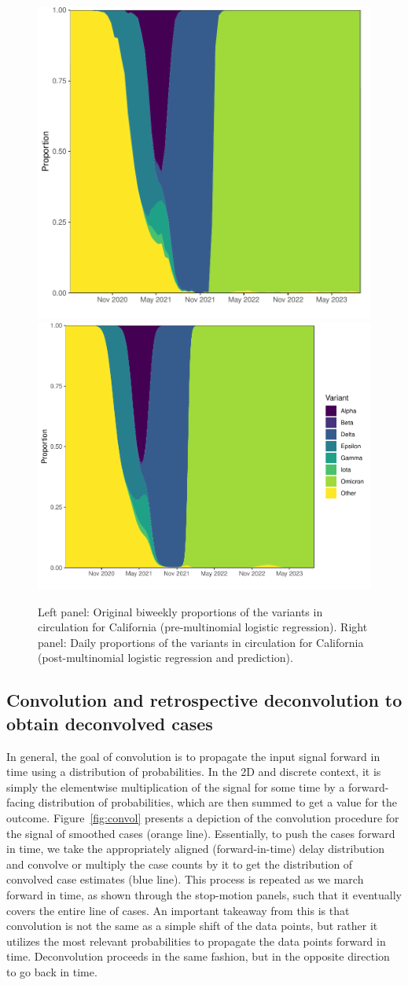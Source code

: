 \documentclass{article}
\begin{document}
\begin{figure}[!tb]
\centering
    \includegraphics[width=0.4\linewidth]{proportions_before_multi.pdf}
    \includegraphics[width=0.47\linewidth]{proportions_after_multi_pred.pdf}
    \caption{Left panel: Original biweekly proportions of the variants in circulation for California (pre-multinomial logistic regression).
    Right panel: Daily proportions of the variants in circulation for California (post-multinomial logistic regression and prediction).}
    \label{fig:prop_figs}
\end{figure}

\subsection{Convolution and retrospective deconvolution to obtain deconvolved cases}
\label{sec:decon}

In general, the goal of convolution is to propagate the input signal forward in time using a distribution of probabilities. In the 2D and discrete context, it is simply the elementwise multiplication of the signal for some time by a forward-facing distribution of probabilities, which are then summed to get a value for the outcome. Figure~\ref{fig:convol} presents a depiction of the convolution procedure for the signal of smoothed cases (orange line). Essentially, to push the cases forward in time, we take the appropriately aligned (forward-in-time) delay distribution and convolve or multiply the case counts by it to get the distribution of convolved case estimates (blue line). This process is repeated as we march forward in time, as shown through the stop-motion panels, such that it eventually covers the entire line of cases. An important takeaway from this is that convolution is not the same as a simple shift of the data points, but rather it utilizes the most relevant probabilities to propagate the data points forward in time. Deconvolution proceeds in the same fashion, but in the opposite direction to go back in time. 
\end{document}
